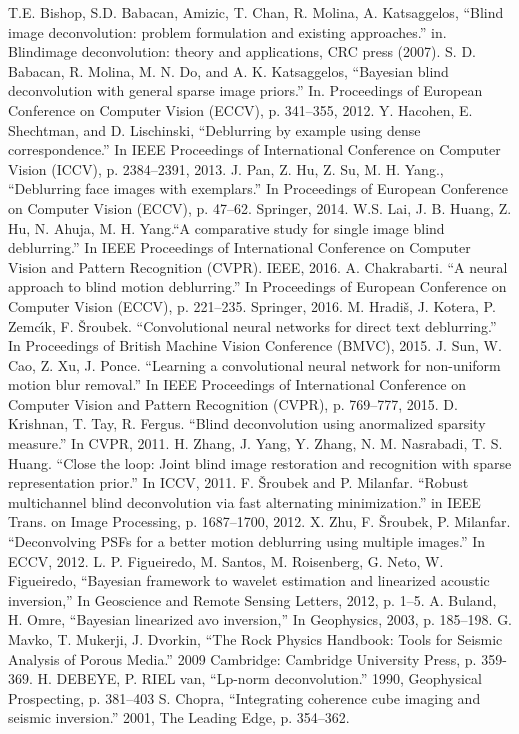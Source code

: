 \documentclass[conference,compsoc]{IEEEtran}
\begin{document}
\begin{thebibliography}{1}
		T.E. Bishop, S.D. Babacan, Amizic, T. Chan, R. Molina, A. Katsaggelos, ``Blind image deconvolution: problem formulation and existing approaches.'' in. Blindimage deconvolution: theory and applications,  CRC press (2007).
		S. D. Babacan, R. Molina, M. N. Do, and A. K. Katsaggelos, ``Bayesian blind deconvolution with general sparse image priors.'' In. Proceedings of European Conference on Computer Vision (ECCV), p. 341–355, 2012.
		Y. Hacohen, E. Shechtman, and D. Lischinski, ``Deblurring by example using dense correspondence.'' In IEEE Proceedings of International Conference on Computer Vision (ICCV), p. 2384–2391, 2013.
		J. Pan, Z. Hu, Z. Su, M. H. Yang., ``Deblurring face images with exemplars.'' In Proceedings of European Conference on Computer Vision (ECCV), p. 47–62. Springer, 2014.
		W.S. Lai, J. B. Huang, Z. Hu, N. Ahuja, M. H. Yang.``A comparative study for single image blind deblurring.'' In IEEE Proceedings of International Conference on Computer Vision and Pattern Recognition (CVPR). IEEE, 2016.
	A. Chakrabarti. ``A neural approach to blind motion deblurring.'' In Proceedings of European Conference on Computer Vision (ECCV), p. 221–235. Springer, 2016.
		M. Hradiš, J. Kotera, P. Zemcı́k, F. Šroubek. ``Convolutional neural networks for direct text deblurring.'' In Proceedings of British Machine Vision Conference (BMVC), 2015.
		J. Sun, W. Cao, Z. Xu, J. Ponce. ``Learning a convolutional neural network for non-uniform motion blur removal.'' In IEEE Proceedings of International Conference on Computer Vision and Pattern Recognition (CVPR), p. 769–777, 2015.
		D. Krishnan, T. Tay, R. Fergus. ``Blind deconvolution using anormalized sparsity measure.'' In CVPR, 2011.
		H. Zhang, J. Yang, Y. Zhang, N. M. Nasrabadi, T. S. Huang. ``Close the loop: Joint blind image restoration and recognition with sparse representation prior.'' In ICCV, 2011. 
		F. Šroubek and P. Milanfar. ``Robust multichannel blind deconvolution via fast alternating minimization.'' in IEEE Trans. on Image Processing, p. 1687–1700, 2012.
		X. Zhu, F. Šroubek, P. Milanfar. ``Deconvolving PSFs for a better motion deblurring using multiple images.'' In ECCV, 2012.
	L. P. Figueiredo, M. Santos, M. Roisenberg, G. Neto, W. Figueiredo, ``Bayesian framework to wavelet estimation and linearized acoustic inversion,'' In Geoscience and Remote Sensing Letters, 2012, p. 1–5.
		A. Buland,  H. Omre, ``Bayesian linearized avo inversion,'' In Geophysics, 2003, p. 185–198.
		G. Mavko, T. Mukerji, J. Dvorkin, ``The Rock Physics Handbook: Tools for Seismic Analysis of Porous Media.'' 2009 Cambridge: Cambridge University Press, p. 359-369.
		H. DEBEYE, P. RIEL van, ``Lp-norm deconvolution.'' 1990, Geophysical Prospecting, p. 381–403
		S. Chopra, ``Integrating coherence cube imaging and seismic inversion.'' 2001, The Leading Edge, p. 354–362.
\end{thebibliography}
\end{document}
